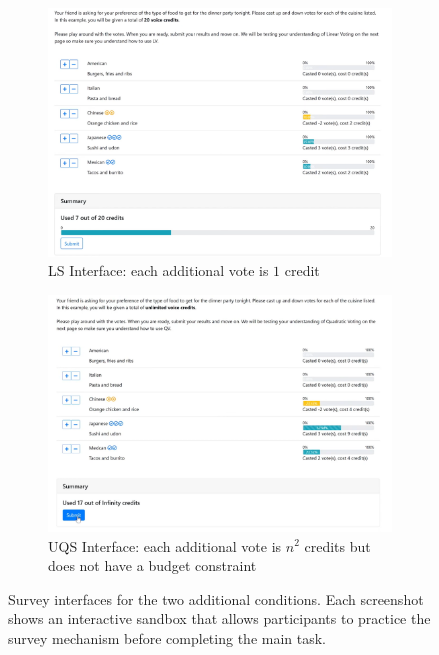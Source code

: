 \begin{figure}
    \centering
    \begin{subfigure}{0.75\textwidth}
        \centering
        \includegraphics[width=\textwidth]{content/image/linear.png}
        \caption{LS Interface: each additional vote is $1$ credit}
        \label{fig:qs_interface}
    \end{subfigure}
    
    \vspace*{1cm}

    \begin{subfigure}{0.75\textwidth}
        \centering
        \includegraphics[width=\textwidth]{content/image/uqs.png}
        \caption{UQS Interface: each additional vote is $n^2$ credits but does not have a budget constraint}
        \label{fig:css_interface}
    \end{subfigure}
    
    \caption{Survey interfaces for the two additional conditions. Each screenshot shows an interactive sandbox that allows  participants to practice the survey mechanism before completing the main task.}
    \label{fig:extended_interface}
\end{figure}

